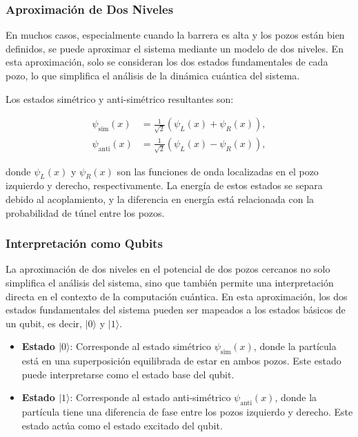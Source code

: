 \documentclass[a4paper,12pt]{article}
\begin{document}
\subsubsection{Aproximación de Dos Niveles}

En muchos casos, especialmente cuando la barrera es alta y los pozos están bien definidos, se puede aproximar el sistema mediante un modelo de dos niveles. En esta aproximación, solo se consideran los dos estados fundamentales de cada pozo, lo que simplifica el análisis de la dinámica cuántica del sistema.

Los estados simétrico y anti-simétrico resultantes son:

\begin{align}
    \psi_{\text{sim}}(x) &= \frac{1}{\sqrt{2}} \left( \psi_L(x) + \psi_R(x) \right), \\
    \psi_{\text{anti}}(x) &= \frac{1}{\sqrt{2}} \left( \psi_L(x) - \psi_R(x) \right),
\end{align}

donde \( \psi_L(x) \) y \( \psi_R(x) \) son las funciones de onda localizadas en el pozo izquierdo y derecho, respectivamente. La energía de estos estados se separa debido al acoplamiento, y la diferencia en energía está relacionada con la probabilidad de túnel entre los pozos.

\subsubsection{Interpretación como Qubits}

La aproximación de dos niveles en el potencial de dos pozos cercanos no solo simplifica el análisis del sistema, sino que también permite una interpretación directa en el contexto de la computación cuántica. En esta aproximación, los dos estados fundamentales del sistema pueden ser mapeados a los estados básicos de un qubit, es decir, \(|0\rangle\) y \(|1\rangle\).

\begin{itemize}
    \item \textbf{Estado \(|0\rangle\)}: Corresponde al estado simétrico \(\psi_{\text{sim}}(x)\), donde la partícula está en una superposición equilibrada de estar en ambos pozos. Este estado puede interpretarse como el estado base del qubit.
    
    \item \textbf{Estado \(|1\rangle\)}: Corresponde al estado anti-simétrico \(\psi_{\text{anti}}(x)\), donde la partícula tiene una diferencia de fase entre los pozos izquierdo y derecho. Este estado actúa como el estado excitado del qubit.
\end{itemize}
\end{document}
